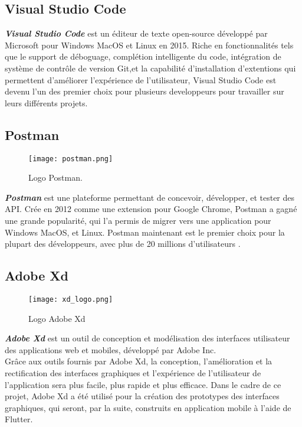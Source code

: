 \subsection{Visual Studio Code}
\textit{\textbf{Visual Studio Code}} \cite{vscode} est un éditeur de texte open-source développé par Microsoft \cite{microsoft} pour Windows MacOS et Linux en 2015. Riche en fonctionnalités tels que le support de déboguage, complétion intelligente du code, intégration de système de contrôle de version Git,et la capabilité d'installation d'extentions qui permettent d'améliorer l'expérience de l'utilisateur, Visual Studio Code est devenu l'un des premier choix pour plusieurs developpeurs pour travailler sur leurs différents projets.
\subsection{Postman}
\begin{figure}[H]
    \centering
    \texttt{[image: postman.png]}
    \vspace{1cm}
    \captionsetup{justification=centering}
    \caption{Logo Postman.}
    \label{fig:postman_logo}
\end{figure}
\textit{\textbf{Postman}} \cite{postman} est une plateforme permettant de concevoir, développer, et tester des API. Crée en 2012 comme une extension pour Google Chrome, Postman a gagné une grande popularité, qui l'a permis de migrer vers une application pour Windows MacOS, et Linux. Postman maintenant est le premier choix pour la plupart des développeurs, avec plus de 20 millions d'utilisateurs \cite{postman_users}.
\subsection{Adobe Xd}
\vspace{1cm}
\begin{figure}[H]
    \centering
    \texttt{[image: xd\_logo.png]}
    \vspace{1cm}
    \captionsetup{justification=centering}

    \caption{Logo Adobe Xd}
    \label{fig:xd_logo}
\end{figure}
\textit{\textbf{Adobe Xd}} \cite{adobe_xd} est un outil de conception et modélisation des interfaces utilisateur des applications web et mobiles, développé par Adobe Inc.\\
\noindent Grâce aux outils fournis par Adobe Xd, la conception, l'amélioration et la rectification des interfaces graphiques et l'expérience de l'utilisateur de l'application sera plus facile, plus rapide et plus efficace.
\noindent Dans le cadre de ce projet, Adobe Xd a été utilisé pour la création des prototypes des interfaces graphiques, qui seront, par la suite, construits en application mobile à l'aide de Flutter.
